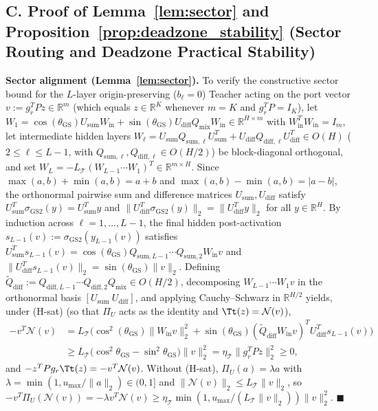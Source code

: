 \subsection*{C. Proof of Lemma~\ref{lem:sector} and Proposition~\ref{prop:deadzone_stability} (Sector Routing and Deadzone Practical Stability)}
\textbf{Sector alignment (Lemma~\ref{lem:sector}).} To verify the constructive sector bound for the \(L\)-layer origin-preserving (\(b_\ell = 0\)) Teacher acting on the port vector \(v := g_r^T P z \in \mathbb{R}^m\) (which equals \(z \in \mathbb{R}^K\) whenever \(m = K\) and \(g_r^T P = I_K\)), let \(W_1 = \cos(\theta_{\mathrm{GS}})U_{\mathrm{sum}}W_{\mathrm{in}} + \sin(\theta_{\mathrm{GS}})U_{\mathrm{diff}}Q_{\mathrm{mix}}W_{\mathrm{in}} \in \mathbb{R}^{H \times m}\) with \(W_{\mathrm{in}}^T W_{\mathrm{in}} = I_m\), let intermediate hidden layers \(W_\ell = U_{\mathrm{sum}}Q_{\mathrm{sum},\ell}U_{\mathrm{sum}}^T + U_{\mathrm{diff}}Q_{\mathrm{diff},\ell}U_{\mathrm{diff}}^T \in O(H)\) (\(2 \le \ell \le L-1\), with \(Q_{\mathrm{sum},\ell}, Q_{\mathrm{diff},\ell} \in O(H/2)\)) be block-diagonal orthogonal, and set \(W_L = -L_{\mathcal{T}}(W_{L-1}\cdots W_1)^T \in \mathbb{R}^{m \times H}\). Since \(\max(a,b) + \min(a,b) = a + b\) and \(\max(a,b) - \min(a,b) = |a - b|\), the orthonormal pairwise sum and difference matrices \(U_{\mathrm{sum}}, U_{\mathrm{diff}}\) satisfy \(U_{\mathrm{sum}}^T \sigma_{\mathrm{GS2}}(y) = U_{\mathrm{sum}}^T y\) and \(\|U_{\mathrm{diff}}^T \sigma_{\mathrm{GS2}}(y)\|_2 = \|U_{\mathrm{diff}}^T y\|_2\) for all \(y \in \mathbb{R}^H\). By induction across \(\ell = 1, \dots, L-1\), the final hidden post-activation \(s_{L-1}(v) := \sigma_{\mathrm{GS2}}(y_{L-1}(v))\) satisfies \(U_{\mathrm{sum}}^T s_{L-1}(v) = \cos(\theta_{\mathrm{GS}})Q_{\mathrm{sum},L-1}\cdots Q_{\mathrm{sum},2}W_{\mathrm{in}} v\) and \(\|U_{\mathrm{diff}}^T s_{L-1}(v)\|_2 = \sin(\theta_{\mathrm{GS}})\|v\|_2\). Defining \(\tilde{Q}_{\mathrm{diff}} := Q_{\mathrm{diff},L-1}\cdots Q_{\mathrm{diff},2}Q_{\mathrm{mix}} \in O(H/2)\), decomposing \(W_{L-1}\cdots W_1v\) in the orthonormal basis \([U_{\mathrm{sum}}\ U_{\mathrm{diff}}]\), and applying Cauchy--Schwarz in \(\mathbb{R}^{H/2}\) yields, under (H-sat) (so that \(\Pi_U\) acts as the identity and \(\Tt(z) = \mathcal{N}(v)\)),
\[
\begin{aligned}
-v^T \mathcal{N}(v) &= L_{\mathcal{T}}\Big(\cos^2(\theta_{\mathrm{GS}})\|W_{\mathrm{in}} v\|_2^2 + \sin(\theta_{\mathrm{GS}})(\tilde{Q}_{\mathrm{diff}}W_{\mathrm{in}} v)^T U_{\mathrm{diff}}^T s_{L-1}(v)\Big)\\ &\ge L_{\mathcal{T}}\big(\cos^2\theta_{\mathrm{GS}} - \sin^2\theta_{\mathrm{GS}}\big)\|v\|_2^2 = \eta_{\mathcal{T}}\|g_r^T P z\|_2^2 \ge 0,
\end{aligned}
\]
and \(-z^TPg_r\Tt(z) = -v^T\mathcal{N}(v)\). Without (H-sat), \(\Pi_U(a) = \lambda a\) with \(\lambda = \min(1, u_{\max}/\|a\|_2) \in (0,1]\) and \(\|\mathcal{N}(v)\|_2 \le L_{\mathcal{T}}\|v\|_2\), so \(-v^T\Pi_U(\mathcal{N}(v)) = -\lambda v^T\mathcal{N}(v) \ge \eta_{\mathcal{T}}\min(1, u_{\max}/(L_{\mathcal{T}}\|v\|_2))\|v\|_2^2\). \hfill \(\blacksquare\)

